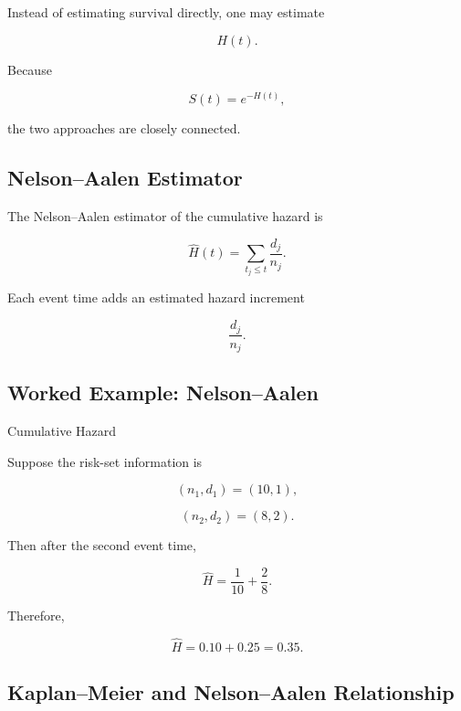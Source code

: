 Instead of estimating survival directly, one may estimate

\[
H(t).
\]

Because

\[
S(t)
=
e^{-H(t)},
\]

the two approaches are closely connected.

\subsection{Nelson--Aalen Estimator}
\label{subsec:nelson-aalen}

The Nelson--Aalen estimator of the cumulative hazard is

\[
\boxed{
\widehat{H}(t)
=
\sum_{t_j\leq t}
\frac{
d_j
}{
n_j
}.
}
\]

Each event time adds an estimated hazard increment

\[
\frac{d_j}{n_j}.
\]

\subsection{Worked Example: Nelson--Aalen}
\label{subsec:worked-nelson-aalen}

\begin{workedexamplebox}{Cumulative Hazard}

Suppose the risk-set information is

\[
(n_1,d_1)
=
(10,1),
\]

\[
(n_2,d_2)
=
(8,2).
\]

Then after the second event time,

\[
\widehat{H}
=
\frac1{10}
+
\frac2{8}.
\]

Therefore,

\begin{answerbox}
\[
\boxed{
\widehat{H}
=
0.10+0.25
=
0.35.
}
\]
\end{answerbox}

\end{workedexamplebox}

\subsection{Kaplan--Meier and Nelson--Aalen Relationship}
\label{subsec:km-na-relationship}

